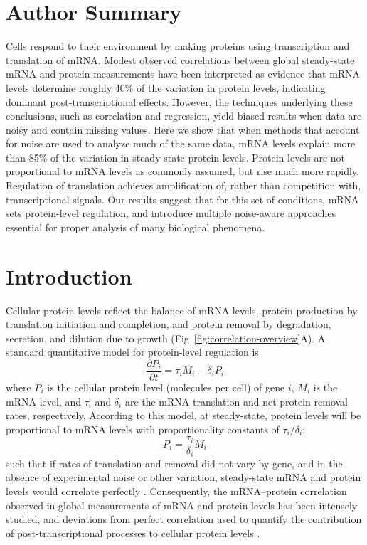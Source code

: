\documentclass[10pt]{article}
\begin{document}
\section*{Author Summary}
Cells respond to their environment by making proteins using transcription and translation of mRNA. Modest observed
correlations between global steady-state mRNA and protein measurements
have been interpreted as evidence that mRNA levels determine
roughly 40\% of the variation in protein levels, indicating dominant
post-transcriptional effects. However, the techniques underlying these
conclusions, such as correlation and regression, yield biased results
when data are noisy and contain missing values. Here we show that when methods that account for noise are used to analyze much of the same data, mRNA levels explain more than 85\% of the variation in steady-state
protein levels. Protein levels are not proportional to mRNA levels as commonly assumed, but rise much more rapidly. Regulation of translation achieves amplification of, rather than competition with, transcriptional signals. Our results suggest that for this set of conditions, mRNA sets protein-level regulation, and introduce multiple noise-aware approaches essential for proper analysis of many biological phenomena.

\section*{Introduction}
Cellular protein levels reflect the balance of mRNA levels,
protein production by translation initiation and completion, and
protein removal by degradation, secretion, and dilution due to growth
\cite{desousa09,Belle2006,schwanhausser11}(Fig~\ref{fig:correlation-overview}A). A standard
quantitative model for protein-level regulation \cite{Beyer2004,Yu2007} is 
\begin{equation}
\frac{\partial P_i}{\partial t} = \tau_i M_i - \delta_i P_i
\label{eq:protein-regulation}
\end{equation}
where \(P_i\) is the cellular protein level (molecules per cell) of
gene \(i\), \(M_i\) is the mRNA level, and \(\tau_i\) and \(\delta_i\) 
are the mRNA translation and net protein removal rates,
respectively. According to this model, at steady-state, protein levels will be proportional to
mRNA levels with proportionality constants of \(\tau_i/\delta_i\):
\begin{equation}
P_i = \frac{\tau_i}{\delta_i}M_i
\label{eq:steady-state-protein}
\end{equation}
such that if rates of translation and removal did not vary by gene, and in the absence of experimental noise or other variation,
steady-state mRNA and protein levels would correlate perfectly
\cite{desousa09}. Consequently, the mRNA--protein correlation observed
in global measurements of mRNA and protein levels has been intensely
studied, and deviations from perfect correlation used to quantify the
contribution of post-transcriptional processes to cellular protein
levels \cite{desousa09,gygi99,maier09,schwanhausser11,siwiak10,
  vogel12}.
\end{document}
